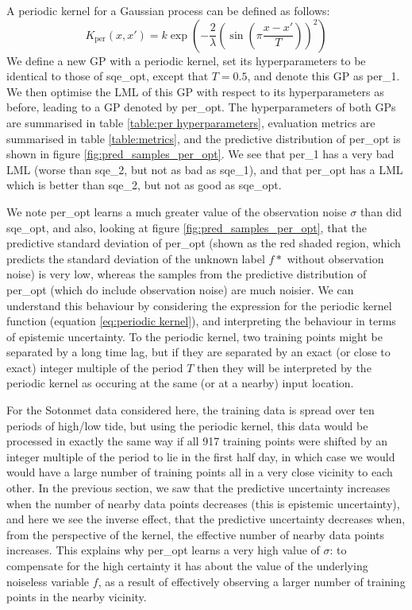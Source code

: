 A periodic kernel for a Gaussian process can be defined as follows:
\begin{equation}
    K_\text{per}(x, x') = k \exp\left( -\frac{2}{\lambda} \left( \sin \left( \pi \frac{x-x'}{T} \right) \right)^2 \right) \label{eq:periodic kernel}
\end{equation}
We define a new GP with a periodic kernel, set its hyperparameters to be identical to those of sqe\_opt, except that $T=0.5$, and denote this GP as per\_1. We then optimise the LML of this GP with respect to its hyperparameters as before, leading to a GP denoted by per\_opt. The hyperparameters of both GPs are summarised in table \ref{table:per hyperparameters}, evaluation metrics are summarised in table \ref{table:metrics}, and the predictive distribution of per\_opt is shown in figure \ref{fig:pred_samples_per_opt}. We see that per\_1 has a very bad LML (worse than sqe\_2, but not as bad as sqe\_1), and that per\_opt has a LML which is better than sqe\_2, but not as good as sqe\_opt.

We note per\_opt learns a much greater value of the observation noise $\sigma$ than did sqe\_opt, and also, looking at figure \ref{fig:pred_samples_per_opt}, that the predictive standard deviation of per\_opt (shown as the red shaded region, which predicts the standard deviation of the unknown label $f*$ without observation noise) is very low, whereas the samples from the predictive distribution of per\_opt (which do include observation noise) are much noisier. We can understand this behaviour by considering the expression for the periodic kernel function (equation \ref{eq:periodic kernel}), and interpreting the behaviour in terms of epistemic uncertainty. To the periodic kernel, two training points might be separated by a long time lag, but if they are separated by an exact (or close to exact) integer multiple of the period $T$ then they will be interpreted by the periodic kernel as occuring at the same (or at a nearby) input location.

For the Sotonmet data considered here, the training data is spread over ten periods of high/low tide, but using the periodic kernel, this data would be processed in exactly the same way if all 917 training points were shifted by an integer multiple of the period to lie in the first half day, in which case we would would have a large number of training points all in a very close vicinity to each other. In the previous section, we saw that the predictive uncertainty increases when the number of nearby data points decreases (this is epistemic uncertainty), and here we see the inverse effect, that the predictive uncertainty decreases when, from the perspective of the kernel, the effective number of nearby data points increases. This explains why per\_opt learns a very high value of $\sigma$: to compensate for the high certainty it has about the value of the underlying noiseless variable $f$, as a result of effectively observing a larger number of training points in the nearby vicinity.

